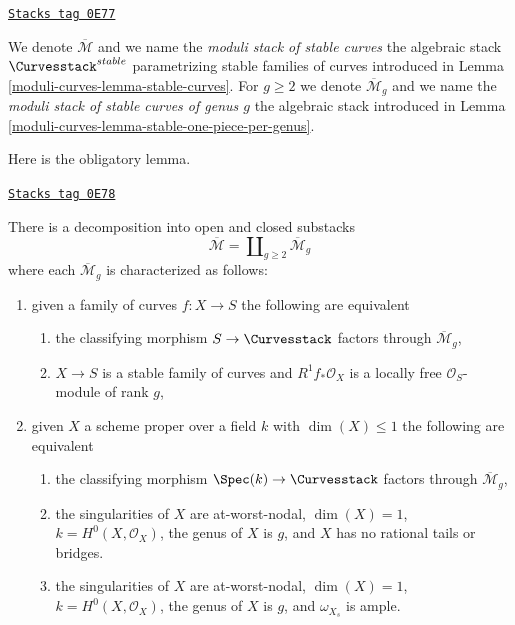 \begin{definition}
\label{moduli-curves-definition-deligne-mumford}
\href{https://stacks.math.columbia.edu/tag/0E77}{\texttt{Stacks tag 0E77}}

\begin{reference}
\cite{DM}
\end{reference}
We denote $\overline{\mathcal{M}}$ and we name the
{\it moduli stack of stable curves} the algebraic stack
$\Curvesstack^{stable}$ parametrizing stable families of curves
introduced in Lemma \ref{moduli-curves-lemma-stable-curves}.
For $g \geq 2$ we denote $\overline{\mathcal{M}}_g$ and we name the
{\it moduli stack of stable curves of genus $g$}
the algebraic stack introduced in Lemma \ref{moduli-curves-lemma-stable-one-piece-per-genus}.
\end{definition}

Here is the obligatory lemma.

\begin{lemma}
\label{moduli-curves-lemma-stable-one-piece-per-genus}
\href{https://stacks.math.columbia.edu/tag/0E78}{\texttt{Stacks tag 0E78}}

There is a decomposition into open and closed substacks
$$
\overline{\mathcal{M}} = \coprod\nolimits_{g \geq 2} \overline{\mathcal{M}}_g
$$
where each $\overline{\mathcal{M}}_g$ is characterized as follows:
\begin{enumerate}
\item given a family of curves $f : X \to S$ the following are equivalent
\begin{enumerate}
\item the classifying morphism $S \to \Curvesstack$ factors
through $\overline{\mathcal{M}}_g$,
\item $X \to S$ is a stable family of curves and
$R^1f_*\mathcal{O}_X$ is a locally free $\mathcal{O}_S$-module of rank $g$,
\end{enumerate}
\item given $X$ a scheme proper over a field $k$ with
$\dim(X) \leq 1$ the following are equivalent
\begin{enumerate}
\item the classifying morphism $\Spec(k) \to \Curvesstack$
factors through $\overline{\mathcal{M}}_g$,
\item the singularities of $X$ are at-worst-nodal, $\dim(X) = 1$,
$k = H^0(X, \mathcal{O}_X)$, the genus of $X$ is $g$, and $X$
has no rational tails or bridges.
\item the singularities of $X$ are at-worst-nodal, $\dim(X) = 1$,
$k = H^0(X, \mathcal{O}_X)$, the genus of $X$ is $g$, and
$\omega_{X_s}$ is ample.
\end{enumerate}
\end{enumerate}
\end{lemma}

